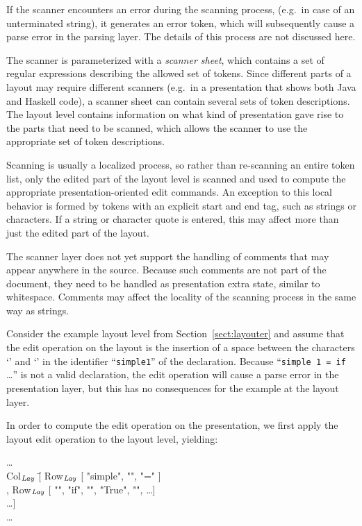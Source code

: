 \documentclass{speauth}
\begin{document}
If the scanner encounters an error during the scanning process, (e.g.\ in case of an unterminated string), it generates an error token, which will subsequently cause a parse error in the parsing layer. The details of this process are not discussed here. 

The scanner is parameterized with a {\em scanner sheet}, which contains a set of regular expressions describing the allowed set of tokens. Since different parts of a layout may require different scanners (e.g.\ in a presentation that shows both Java and Haskell code), a scanner sheet can contain several sets of token descriptions. The layout level contains information on what kind of presentation gave rise to the parts that need to be scanned, which allows the scanner to use the appropriate set of token descriptions.

Scanning is usually a localized process, so rather than re-scanning an entire token list, only the edited part of the layout level is scanned and used to compute the appropriate presentation-oriented edit commands. An exception to this local behavior is formed by tokens with an explicit start and end tag, such as strings or characters. If a string or character quote is entered, this may affect more than just the edited part of the layout.

The scanner layer does not yet support the handling of comments that may appear anywhere in the source. Because such comments are not part of the document, they need to be handled as presentation extra state, similar to whitespace. Comments may affect the locality of the scanning process in the same way as strings.

Consider the example layout level from Section~\ref{sect:layouter} and assume that the edit operation on the layout is the insertion of a space between the characters `' and `' in the identifier ``\verb|simple1|'' of the declaration. Because ``\verb|simple 1 = if |\dots'' is not a valid declaration, the edit operation will cause a parse error in the presentation layer, but this has no consequences for the example at the layout layer.

In order to compute the edit operation on the presentation, we first apply the layout edit operation to the layout level, yielding:

\small \ttfamily
\begin{tabbing}
\dots\\
Col$_{\mathit{Lay}}$ \= [ Row$_{\mathit{Lay}}$ [ "simple", "\textvisiblespace", "=" ]\\
                   \> , Row$_{\mathit{Lay}}$ [ "\textvisiblespace\textvisiblespace", 
                                                 "if", "\textvisiblespace", "True", "\textvisiblespace", \dots ] \\
                   \> \dots ]\\
\dots
\end{tabbing}
\rmfamily \normalsize
\end{document}

